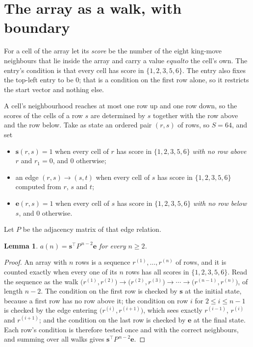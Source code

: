 \documentclass[11pt,a4paper]{article}
\theoremstyle{plain}
\newtheorem{lemma}[theorem]{Lemma}
\theoremstyle{definition}
\begin{document}
\section{The array as a walk, with boundary}

For a cell of the array let its \emph{score} be the number of the eight king-move neighbours that lie inside
the array and carry a value $equal to$ the cell's own. The entry's condition is that every cell
has score in $\{1,2,3,5,6\}$. The entry also fixes the top-left entry to be $0$; that is a condition on the first row alone, so it restricts the start vector and nothing else.

A cell's neighbourhood reaches at most one row up and one row down, so the scores of the
cells of a row $s$ are determined by $s$ together with the row above and the row below.
Take as state an ordered pair $(r,s)$ of rows, so $S=64$, and set
\begin{itemize}
\item $\mathbf{s}(r,s)=1$ when every cell of $r$ has score in $\{1,2,3,5,6\}$ \emph{with no row
above $r$} and $r_1=0$, and $0$ otherwise;
\item an edge $(r,s)\to(s,t)$ when every cell of $s$ has score in $\{1,2,3,5,6\}$ computed from
$r$, $s$ and $t$;
\item $\mathbf{e}(r,s)=1$ when every cell of $s$ has score in $\{1,2,3,5,6\}$ \emph{with no row
below $s$}, and $0$ otherwise.
\end{itemize}
Let $P$ be the adjacency matrix of that edge relation.

\begin{lemma}\label{lem:walk}
$a(n)=\mathbf{s}^{\!\top}P^{\,n-2}\mathbf{e}$ for every $n\ge2$.
\end{lemma}

\begin{proof}
An array with $n$ rows is a sequence $r^{(1)},\dots,r^{(n)}$ of rows, and it is counted
exactly when every one of its $n$ rows has all scores in $\{1,2,3,5,6\}$. Read the sequence as the
walk $\bigl(r^{(1)},r^{(2)}\bigr)\to\bigl(r^{(2)},r^{(3)}\bigr)\to\cdots\to
\bigl(r^{(n-1)},r^{(n)}\bigr)$, of length $n-2$. The condition on the first row is
checked by $\mathbf{s}$ at the initial state, because a first row has no row above it; the
condition on row $i$ for $2\le i\le n-1$ is checked by the edge entering
$\bigl(r^{(i)},r^{(i+1)}\bigr)$, which sees exactly $r^{(i-1)}$, $r^{(i)}$ and
$r^{(i+1)}$; and the condition on the last row is checked by $\mathbf{e}$ at the final
state. Each row's condition is therefore tested once and with the correct neighbours, and
summing over all walks gives $\mathbf{s}^{\!\top}P^{\,n-2}\mathbf{e}$.
\end{proof}
\end{document}
